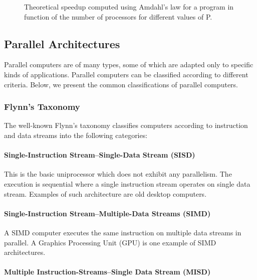 \begin{figure}[phbt]
\centering
\captionsetup{justification=centering}

\caption{Theoretical speedup computed using Amdahl’s law for a program in function of the number of processors for different values of P.}
\label{fig:amdhal}
\end{figure} 

\subsection{Parallel Architectures}

Parallel computers are of many types, some of which are adapted only to specific kinds of applications. Parallel computers can be classified according to different criteria. Below, we present the common classifications of parallel computers. 

\subsubsection{Flynn's Taxonomy}

The well-known Flynn's taxonomy \cite{flynn:1972} classifies computers according to instruction and data streams into the following categories:

\paragraph{Single-Instruction Stream--Single-Data Stream (SISD)}

This is the basic uniprocessor which does not exhibit any parallelism. The execution is sequential where a single instruction stream operates on single data stream. Examples of such architecture are old desktop computers.

\paragraph{Single-Instruction Stream--Multiple-Data Streams (SIMD)}

A SIMD computer executes the same instruction on multiple data streams in parallel. A Graphics Processing Unit (GPU) is one example of SIMD architectures.

\paragraph{Multiple Instruction-Streams--Single Data Stream (MISD)}

